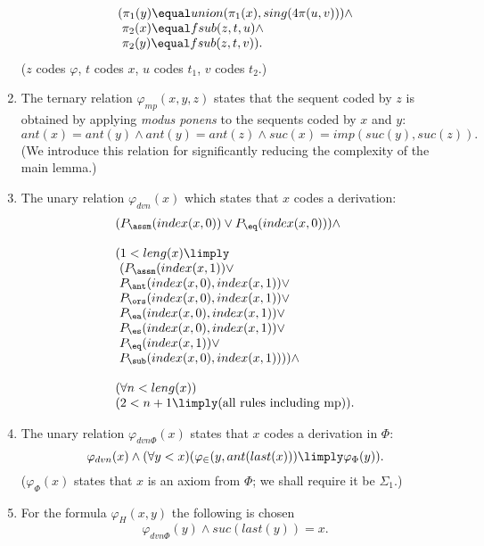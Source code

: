 \begin{enumerate}[1.]
\[\begin{array}{l}
(\pi_1(y) \equal union(\pi_1(x), sing(4\pi(u, v))) \land \cr
\ \pi_2(x) \equal fsub(z, t, u) \land \cr
\ \pi_2(y) \equal fsub(z, t, v)).
\end{array}
\]
($z$ codes $\varphi$, $t$ codes $x$, $u$ codes $t_1$, $v$ codes $t_2$.)
%
\item The ternary relation $\varphi_{mp}(x, y, z)$ states that the sequent coded by $z$ is obtained by applying \emph{modus ponens} to the sequents coded by $x$ and $y$:
\[
ant(x) \equal ant(y) \land ant(y) \equal ant(z) \land suc(x) \equal imp(suc(y), suc(z)).
\]
(We introduce this relation for significantly reducing the complexity of the main lemma.)
%
\item The unary relation $\varphi_{dvn}(x)$ which states that $x$ codes a derivation:
\[
\begin{array}{l}
(P_\assm(index(x, 0)) \lor P_\eq(index(x, 0))) \land \cr
\ \cr
(1 < leng(x) \limply \cr
\ (P_\assm(index(x, 1)) \lor \cr
\ P_\ant(index(x, 0), index(x, 1)) \lor \cr
\ P_\ors(index(x, 0), index(x, 1)) \lor \cr
\ P_\ea(index(x, 0), index(x, 1)) \lor \cr
\ P_\es(index(x, 0), index(x, 1)) \lor \cr
\ P_\eq(index(x, 1)) \lor \cr
\ P_\sub(index(x, 0), index(x, 1)))) \land \cr
\ \cr
(\forall n < leng(x)) \cr
(2 < n + 1 \limply (\mbox{all rules including mp})).
\end{array}
\]
%
\item The unary relation $\varphi_{dvn\Phi}(x)$ states that $x$ codes a derivation in $\Phi$:
\[
\varphi_{dvn}(x) \land (\forall y < x)(\varphi_\in(y, ant(last(x))) \limply \varphi_\Phi(y)).
\]
($\varphi_\Phi(x)$ states that $x$ is an axiom from $\Phi$; we shall require it be $\Sigma_1$.)
%
\item For the formula $\varphi_H(x, y)$ the following is chosen
\[
\varphi_{dvn\Phi}(y) \land suc(last(y)) \equal x.
\]
%
\end{enumerate}
\ \\